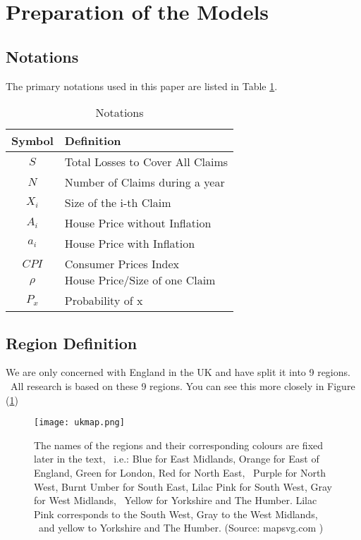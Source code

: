 \documentclass[12pt]{article}  %
\begin{document}
\section{Preparation of the Models}

\subsection{Notations}
The primary notations used in this paper are listed in Table \ref{tb:notation}.

\begin{table}[!htbp]
\begin{center}
\caption{Notations}
\begin{tabular}{cl}
	\toprule
	\multicolumn{1}{m{3cm}}{\centering Symbol}
	&\multicolumn{1}{m{8cm}}{\centering Definition}\\
	\midrule
	$S$&Total Losses to Cover All Claims\\
	$N$&Number of Claims during a year\\
	$X_i$ &Size of the i-th Claim\\
    $A_i$ &House Price without Inflation\\
    $a_i$ &House Price with Inflation\\
    $CPI$ &Consumer Prices Index \\
	$\rho$ & $\text{House Price} / \text{Size of one Claim}$ \\
    $P_{x}$ & Probability of x \\
	\bottomrule
\end{tabular}\label{tb:notation}
\end{center}
\end{table}


\subsection{Region Definition}

We are only concerned with England in the UK and have split it into 9 regions. \
All research is based on these 9 regions. You can see this more closely in Figure (\ref{fig:ukmap})

\begin{figure}
    \centering
    \texttt{[image: ukmap.png]}
    \caption{The names of the regions and their corresponding colours are fixed later in the text, \
    i.e.: Blue for East Midlands, Orange for East of England, Green for London, Red for North East, \
    Purple for North West, Burnt Umber for South East, Lilac Pink for South West, Gray for West Midlands, \
    Yellow for Yorkshire and The Humber. Lilac Pink corresponds to the South West, Gray to the West Midlands, \
    and yellow to Yorkshire and The Humber. (Source: mapsvg.com \textsuperscript{\cite{map}})}\label{fig:ukmap}
\end{figure}
\end{document}
